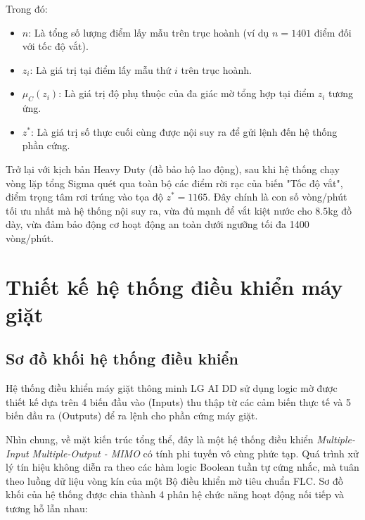 \documentclass[12pt, a4paper]{article}
\begin{document}
Trong đó:
\begin{itemize}
    \item $n$: Là tổng số lượng điểm lấy mẫu trên trục hoành (ví dụ $n = 1401$ điểm đối với tốc độ vắt).
    \item $z_i$: Là giá trị tại điểm lấy mẫu thứ $i$ trên trục hoành.
    \item $\mu_C(z_i)$: Là giá trị độ phụ thuộc của đa giác mờ tổng hợp tại điểm $z_i$ tương ứng.
    \item $z^*$: Là giá trị số thực cuối cùng được nội suy ra để gửi lệnh đến hệ thống phần cứng.
\end{itemize}

Trở lại với kịch bản Heavy Duty (đồ bảo hộ lao động), sau khi hệ thống chạy vòng lặp tổng Sigma quét qua toàn bộ các điểm rời rạc của biến "Tốc độ vắt", điểm trọng tâm rơi trúng vào tọa độ $z^* = 1165$. Đây chính là con số vòng/phút tối ưu nhất mà hệ thống nội suy ra, vừa đủ mạnh để vắt kiệt nước cho $8.5$kg đồ dày, vừa đảm bảo động cơ hoạt động an toàn dưới ngưỡng tối đa 1400 vòng/phút.

\section{Thiết kế hệ thống điều khiển máy giặt}

\subsection{Sơ đồ khối hệ thống điều khiển}
Hệ thống điều khiển máy giặt thông minh LG AI DD sử dụng logic mờ được thiết kế dựa trên 4 biến đầu vào (Inputs) thu thập từ các cảm biến thực tế và 5 biến đầu ra (Outputs) để ra lệnh cho phần cứng máy giặt.

Nhìn chung, về mặt kiến trúc tổng thể, đây là một hệ thống điều khiển \textit{Multiple-Input Multiple-Output - MIMO} có tính phi tuyến vô cùng phức tạp. Quá trình xử lý tín hiệu không diễn ra theo các hàm logic Boolean tuần tự cứng nhắc, mà tuân theo luồng dữ liệu vòng kín của một Bộ điều khiển mờ tiêu chuẩn FLC. Sơ đồ khối của hệ thống được chia thành 4 phân hệ chức năng hoạt động nối tiếp và tương hỗ lẫn nhau:
\end{document}
